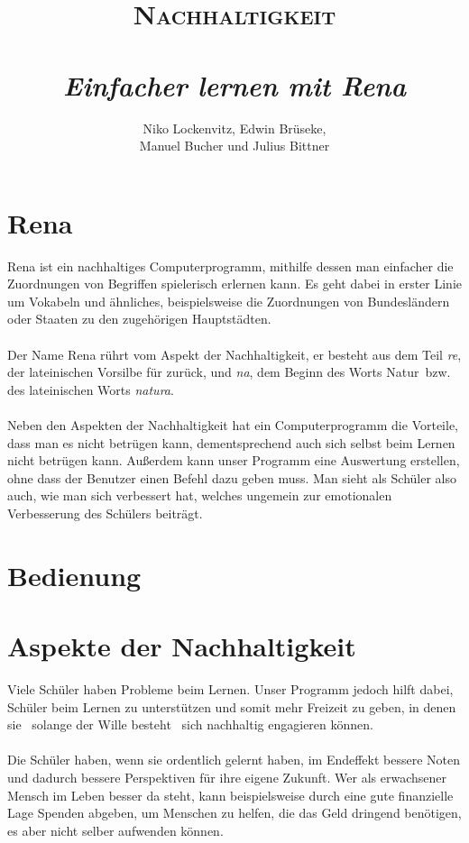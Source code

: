 \documentclass[a4paper, 11pt, titlepage]{article}
\author{Niko Lockenvitz, Edwin Brüseke,\\Manuel Bucher und Julius Bittner}
\title{\textsc{Nachhaltigkeit}\\\ \\\textsl{Einfacher lernen mit Rena}}
\begin{document}
\maketitle
\tableofcontents
\section{Rena}
Rena ist ein nachhaltiges Computerprogramm, mithilfe dessen man einfacher die Zuordnungen von Begriffen spielerisch erlernen kann. Es geht dabei in erster Linie um Vokabeln und ähnliches, beispielsweise die Zuordnungen von Bundesländern oder Staaten zu den zugehörigen Hauptstädten.\\\\
Der Name Rena rührt vom Aspekt der Nachhaltigkeit, er besteht aus dem Teil \textit{re}, der lateinischen Vorsilbe für \glqq zurück\grqq , und \textit{na}, dem Beginn des Worts \glqq Natur\grqq\ bzw. des lateinischen Worts \textit{natura}.\\\\
Neben den Aspekten der Nachhaltigkeit hat ein Computerprogramm die Vorteile, dass man es nicht betrügen kann, dementsprechend auch sich selbst beim Lernen nicht betrügen kann. Außerdem kann unser Programm eine Auswertung erstellen, ohne dass der Benutzer einen Befehl dazu geben muss. Man sieht als Schüler also auch, wie man sich verbessert hat, welches ungemein zur emotionalen Verbesserung des Schülers beiträgt.

\section{Bedienung}

\section{Aspekte der Nachhaltigkeit}
Viele Schüler haben Probleme beim Lernen. Unser Programm jedoch hilft dabei, Schüler beim Lernen zu unterstützen und somit mehr Freizeit zu geben, in denen sie \textendash\ solange der Wille besteht \textendash\ sich nachhaltig engagieren können.\\\\
Die Schüler haben, wenn sie ordentlich gelernt haben, im Endeffekt bessere Noten und dadurch bessere Perspektiven für ihre eigene Zukunft. Wer als erwachsener Mensch im Leben besser da steht, kann beispielsweise durch eine gute finanzielle Lage Spenden abgeben, um Menschen zu helfen, die das Geld dringend benötigen, es aber nicht selber aufwenden können.
\end{document}
